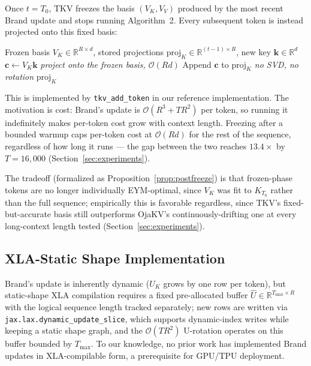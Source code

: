 \documentclass{article}
\newcommand{\R}{\mathbb{R}}
\begin{document}
Once $t = T_0$, TKV freezes the basis $(V_K, V_V)$ produced by the most
recent Brand update and stops running Algorithm~2.  Every subsequent token
is instead projected onto this fixed basis:

\begin{algorithm}[H]
\caption{TKV Frozen-Phase Token Update (per token, $t > T_0$)}
\begin{algorithmic}[1]
\Require Frozen basis $V_K \in \R^{R \times d}$, stored projections
         $\mathrm{proj}_K \in \R^{(t-1) \times R}$, new key $\mathbf{k} \in \R^d$
\State $\mathbf{c} \leftarrow V_K \mathbf{k}$ \hfill \textit{project onto the frozen basis, $\mathcal{O}(Rd)$}
\State Append $\mathbf{c}$ to $\mathrm{proj}_K$ \hfill \textit{no SVD, no rotation}
\State \Return $\mathrm{proj}_K$
\end{algorithmic}
\end{algorithm}

This is implemented by \texttt{tkv\_add\_token} in our reference
implementation.  The motivation is cost: Brand's update is
$\mathcal{O}(R^3 + TR^2)$ per token, so running it indefinitely makes
per-token cost grow with context length.  Freezing after a bounded warmup
caps per-token cost at $\mathcal{O}(Rd)$ for the rest of the sequence,
regardless of how long it runs --- the gap between the two reaches
$13.4\times$ by $T=16{,}000$ (Section~\ref{sec:experiments}).

The tradeoff (formalized as Proposition~\ref{prop:postfreeze}) is that
frozen-phase tokens are no longer individually EYM-optimal, since $V_K$ was
fit to $K_{T_0}$ rather than the full sequence; empirically this is
favorable regardless, since TKV's fixed-but-accurate basis still
outperforms OjaKV's continuously-drifting one at every long-context length
tested (Section~\ref{sec:experiments}).

\subsection{XLA-Static Shape Implementation}
\label{sec:xla}

Brand's update is inherently dynamic ($U_K$ grows by one row per token), but
static-shape XLA compilation requires a fixed pre-allocated buffer
$\hat{U} \in \R^{T_{\max} \times R}$ with the logical sequence length
tracked separately; new rows are written via
\texttt{jax.lax.dynamic\_update\_slice}, which supports dynamic-index
writes while keeping a static shape graph, and the $\mathcal{O}(TR^2)$
U-rotation operates on this buffer bounded by $T_{\max}$.  To our
knowledge, no prior work has implemented Brand updates in XLA-compilable
form, a prerequisite for GPU/TPU deployment.
\end{document}
